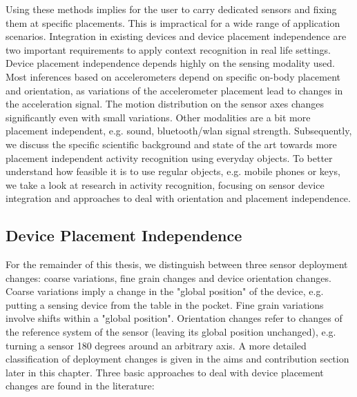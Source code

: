 Using these methods implies for the user to carry dedicated sensors and fixing them
at specific placements. This is impractical for a wide range of application scenarios.
Integration in existing devices and device placement
independence are two important requirements to apply context recognition in real life settings. 
Device placement independence depends highly on the sensing modality used.
Most inferences based on accelerometers depend 
on specific on-body placement and orientation, as variations of the accelerometer placement lead to 
 changes in the acceleration signal. The motion distribution on the sensor axes changes significantly even with small variations. 
Other modalities are a bit more placement independent, e.g. sound, bluetooth/wlan signal strength.
Subsequently, we discuss the specific scientific background and
state of the art towards more placement independent activity
recognition using everyday objects. To better understand how
feasible it is to use regular objects, e.g. mobile phones or keys, we
take a look at research in activity recognition, focusing 
on sensor device integration and approaches to deal with orientation
and placement independence.


\subsection{Device Placement Independence}

For the remainder of this thesis, we distinguish between three sensor
deployment changes: coarse variations, fine grain changes and device orientation changes.
Coarse variations imply a change in  the  "global
position" of the device, e.g. putting a sensing device from the table in the
pocket. Fine grain variations involve shifts within a "global position". Orientation changes refer to changes of the reference system
of the sensor (leaving its global position unchanged), e.g. turning a
sensor 180 degrees around an arbitrary axis. A more detailed classification of deployment changes
is given in the aims and contribution section later in this chapter. 
Three basic approaches to deal with device
placement changes are found in the literature:

